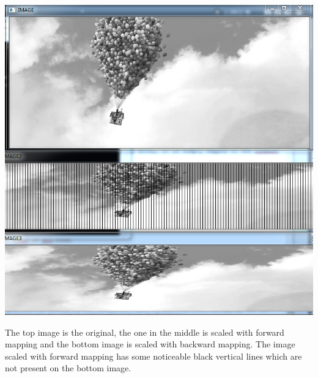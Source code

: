 \documentclass[11pt,oneside,a4paper,openright]{report}
\begin{document}
\begin{center}
\includegraphics[scale=0.75]{result}
\end{center}
The top image is the original, the one in the middle is scaled with forward mapping and the bottom image is scaled with backward mapping. The image scaled with forward mapping has some noticeable black vertical lines which are not present on the bottom image. 
\end{document}
